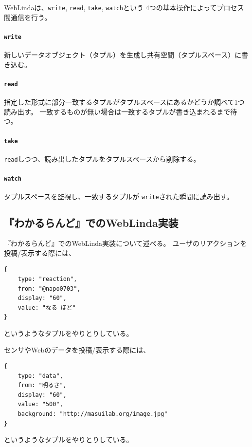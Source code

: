 WebLindaは、\texttt{write}, \texttt{read}, \texttt{take}, \texttt{watch}という
4つの基本操作によってプロセス間通信を行う。


\vspace{2mm}
\paragraph*{\texttt{write}}
新しいデータオブジェクト（タプル）を生成し共有空間（タプルスペース）に書き込む。

\vspace{4mm}
\paragraph*{\texttt{read}}
指定した形式に部分一致するタプルがタプルスペースにあるかどうか調べて1つ読み出す。
一致するものが無い場合は一致するタプルが書き込まれるまで待つ。

\vspace{2mm}
\paragraph*{\texttt{take}}
\texttt{read}しつつ、読み出したタプルをタプルスペースから削除する。

\vspace{2mm}
\paragraph*{\texttt{watch}}
タプルスペースを監視し、一致するタプルが
\texttt{write}された瞬間に読み出す。

\subsection{『わかるらんど』でのWebLinda実装}
『わかるらんど』でのWebLinda実装について述べる。
ユーザのリアクションを投稿/表示する際には、

\begin{lstlisting}
{
    type: "reaction",
    from: "@napo0703",
    display: "60",
    value: "なる ほど"
}
\end{lstlisting}
というようなタプルをやりとりしている。

センサやWebのデータを投稿/表示する際には、
\begin{lstlisting}
{
    type: "data",
    from: "明るさ",
    display: "60",
    value: "500",
    background: "http://masuilab.org/image.jpg"
}
\end{lstlisting}
というようなタプルをやりとりしている。

